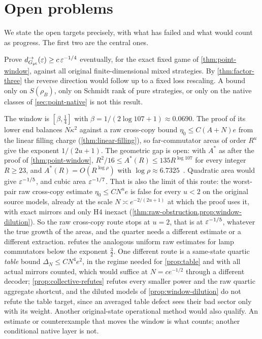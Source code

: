 \section{Open problems}\label{sec:open}

We state the open targets precisely, with what has failed and what would count as progress. The first two are the central ones.

\begin{problem}\label{prob:quarter}
Prove $d^\to_{G_{\mathrm{pt}}}(\varepsilon)\ge c\,\varepsilon^{-1/4}$ eventually, for the exact fixed game of \cref{thm:point-window}, against all original
finite-dimensional mixed strategies. By \cref{thm:factor-three} the reverse direction would follow up to a fixed loss rescaling. A bound
only on $S(\rho_B)$, only on Schmidt rank of pure strategies, or only on the native classes of \cref{sec:point-native} is not this result.
\end{problem}

The window is $[\beta,\frac14]$ with $\beta=1/(2\log107+1)\approx0.0690$. The proof of its lower end balances $N\kappa^2$
against a raw cross-copy bound $\eta_0\le C(A+N)e$ from the linear filling charge (\cref{thm:linear-filling}), so far-commutator
areas of order $R^u$ give the exponent $1/(2u+1)$. The geometric gap is open: with $A^*$ as after the proof of
\cref{thm:point-window}, $R^2/16\le A^*(R)\le135R^{\log107}$ for every integer $R\ge23$, and $A^*(R)=O(R^{\log\rho})$ with
$\log\rho\approx6.7325$~\cite[Proposition~3.4, Theorem~3.2 and Remark~A.3]{DM-H3}. Quadratic area would give $\varepsilon^{-1/5}$, and
cubic area $\varepsilon^{-1/7}$. That is also the limit of this route: the worst-pair raw cross-copy estimate $\eta_0\le CN^ue$ is false
for every $u<2$ on the original source models, already at the scale $N\asymp e^{-2/(2u+1)}$ at which the proof uses it, with exact
mirrors and only H4 inexact (\cref{thm:raw-obstruction,prop:window-dilution}). So the raw cross-copy route stops at $u=2$, that is at
$\varepsilon^{-1/5}$, whatever the true growth of the areas, and the quarter needs a different estimate or a different extraction.
 refutes the analogous uniform raw estimates for lamp commutators below the exponent $\frac32$. One different route
is a same-state quartic \emph{table} bound $\Delta_N\le CN^4e^2$, in the regime needed for \cref{prop:table} and with all actual mirrors
counted, which would suffice at $N=ce^{-1/2}$ through a different decoder; \cref{prop:collective-refutes} refutes every smaller power
and the raw quartic aggregate shortcut, and the diluted models of \cref{prop:window-dilution} do not refute the table target, since an
averaged table defect sees their bad sector only with its weight. Another original-state operational method would also qualify. An
estimate or counterexample that moves the window is what counts; another conditional native layer is not.

